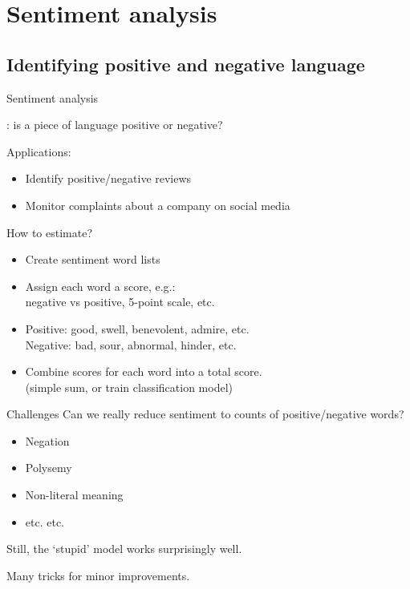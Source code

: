 \documentclass[aspectratio=169,usenames,dvipsnames]{beamer}
\begin{document}


\section{Sentiment analysis}
\subsection{Identifying positive and negative language}
\frame{\tableofcontents[currentsection]}

\begin{frame}{Sentiment analysis}
	\begin{definition}
        : 
            is a piece of language positive or negative?
	\end{definition}

    Applications:
    \begin{itemize}
        \item Identify positive/negative reviews
        \item Monitor complaints about a company on social media
    \end{itemize}

    \pause
    How to estimate?
	\begin{itemize}
		\item Create sentiment word lists
		\item Assign each word a score, e.g.: \\
            negative vs positive, 5-point scale, etc.
        \item Positive: good, swell, benevolent, admire, etc. \\
                Negative: bad, sour, abnormal, hinder, etc.
        \item Combine scores for each word into a total score. \\
                (simple sum, or train classification model)
	\end{itemize}
\end{frame}

\begin{frame}{Challenges}
    Can we really reduce sentiment to counts of positive/negative words?

    \begin{itemize}
        \item Negation
        \item Polysemy
        \item Non-literal meaning
        \item etc. etc.
    \end{itemize}

    Still, the `stupid' model works surprisingly well.

    Many tricks for minor improvements.
\end{frame}
\end{document}
